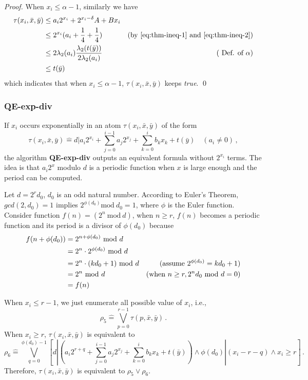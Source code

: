 \documentclass[runningheads]{llncs}
\newcommand\znj[1]{\textcolor{red}{#1}}
\newcommand{\Def}{\hat{=}}
\begin{document}
\begin{proof}
When $x_i \le \alpha-1$, similarly we have
\begin{align}
    \tau(x_i,\bar{x},\bar{y})\notag 
    & \le  a_i 2^{x_i} + 2^{x_i -\delta}A  + Bx_i &  \notag \\
    & \le  2^{x_i}(a_i +\frac{1}{4} +\frac{1}{4}) &(\mbox{by \eqref{eq:thm-ineq-1} and  \eqref{eq:thm-ineq-2}}) \notag \\
   & \le  2\lambda_2(a_i)\frac{\lambda_2(t(\bar{y}))}{2\lambda_2(a_i)} &  (\mbox{ Def. of } \alpha) \notag \\
   &  \le  t(\bar{y}) & \notag 
\end{align}
which indicates that when  $x_i \le \alpha-1$, $\tau(x_i,\bar{x},\bar{y})$ keeps \textit{true}. \qed 
\end{proof}

\subsubsection{QE-exp-div}

If $x_i$ occurs exponentially in an atom $\tau(x_i,\bar{x},\bar{y})$ of the form
$$\tau(x_i,\bar{x},\bar{y}) \Def  d| a_i 2^{x_i}+\sum_{j=0}^{i-1} a_j 2^{x_j} + \sum_{k=0}^{i} b_k x_k+t(\bar{y}) \quad (a_i \neq 0)\,,$$
the algorithm \textbf{QE-exp-div} outputs an equivalent formula without $2^{x_i}$ terms.
The idea is that $a_i 2^x$ modulo $d$ is a periodic function when $x$ is large enough and the period can be computed.

Let $d = 2^rd_0$, $d_0$ is an odd natural number. 
According to Euler's Theorem, 
$gcd(2,d_0)=1$ implies
$2^{\phi(d_0)} \text{mod}\ d_0 = 1$,
where $\phi$ is the Euler function.
Consider function $f(n)=(2^n\ \text{mod} \ d)$,
when $n\ge r$, 
$f(n)$ becomes a periodic function and its period is a divisor of $\phi(d_0)$ because
\begin{align}
    f(n+\phi(d_0)) 
    &=2^{n+\phi(d_0)}\ \text{mod}\ d &\notag\\
    &=2^n\cdot 2^{\phi(d_0)}\ \text{mod}\ d &\notag\\
    &=2^n\cdot (k d_0 + 1) \ \text{mod}\ d &
    (\mbox{assume } 2^{\phi(d_0)}=k d_0 +1) \notag \\
    &= 2^n \ \text{mod}\ d &
    (\mbox{when } n\ge r, 2^n d_0\ \text{mod}\ d = 0 )\notag\\
    &= f(n) \notag
\end{align}

When $x_i\le r-1$, we just enumerate all possible value of $x_i$, i.e., 
$$\rho_5 \Def \bigvee_{p=0}^{r-1} \tau(p,\bar{x},\bar{y})\,.$$
When $x_i\ge r$, $\tau(x_i,\bar{x},\bar{y})$ is equivalent to
$$
\rho_6 \Def \bigvee_{q=0}^{\phi(d_0)-1} [d|(a_i 2^{r+q}+\sum_{j=0}^{i-1} a_j 2^{x_j}
+  \sum_{k=0}^{i} b_k x_k+t(\bar{y})) \wedge \phi(d_0)|(x_i-r-q) \wedge x_i \ge r] \,.
$$
            Therefore,  $\tau(x_i,\bar{x},\bar{y})$ is equivalent to  $\rho_5 \vee \rho_6$.
\end{document}
